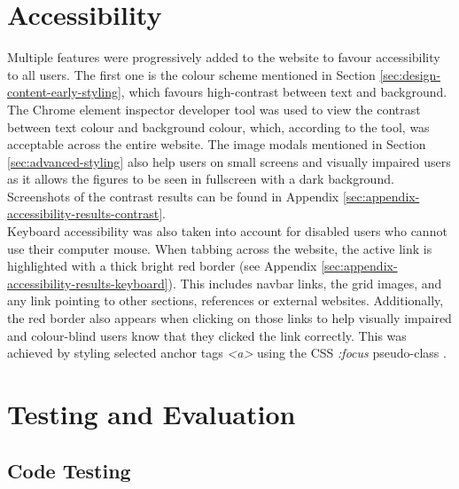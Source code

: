 \documentclass[letterpaper,12pt]{article}
\begin{document}

\section{Accessibility}
\label{sec:accessibility}

Multiple features were progressively added to the website to favour accessibility to all users. The first one is the colour scheme mentioned in Section \ref{sec:design-content-early-styling}, which favours high-contrast between text and background. The Chrome element inspector developer tool was used to view the contrast between text colour and background colour, which, according to the tool, was acceptable across the entire website. The image modals mentioned in Section \ref{sec:advanced-styling} also help users on small screens and visually impaired users as it allows the figures to be seen in fullscreen with a dark background. Screenshots of the contrast results can be found in Appendix \ref{sec:appendix-accessibility-results-contrast}.\\

Keyboard accessibility was also taken into account for disabled users who cannot use their computer mouse. When tabbing across the website, the active link is highlighted with a thick bright red border (see Appendix \ref{sec:appendix-accessibility-results-keyboard}). This includes navbar links, the grid images, and any link pointing to other sections, references or external websites. Additionally, the red border also appears when clicking on those links to help visually impaired and colour-blind users know that they clicked the link correctly. This was achieved by styling selected anchor tags \textit{\textless a\textgreater} using the CSS \textit{:focus} pseudo-class \cite{css-focus}.


\section{Testing and Evaluation}
\label{sec:testing-evaluation}

\subsection{Code Testing}
\end{document}
